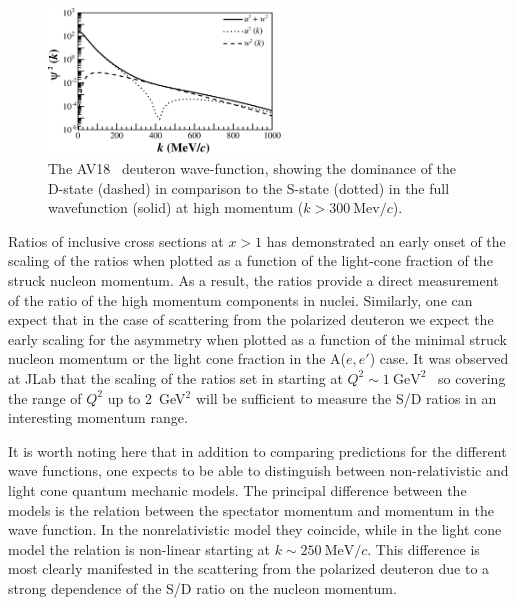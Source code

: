 \begin{figure}
\begin{center}
\includegraphics[width=0.55\textwidth]{figs/sd_wf_av18.eps}
\caption{\label{sd-wf} The AV18~\cite{PhysRevC.84.034003} deuteron wave-function, showing the dominance of the D-state (dashed) in comparison to the S-state (dotted) in the full wavefunction (solid) at high momentum ($k>300\mathrm{~Mev}/c$).}
\end{center}
\end{figure}

Ratios of inclusive cross sections at $x>1$ has demonstrated an early onset of the scaling of the ratios when plotted as a function of the light-cone fraction of the struck nucleon momentum.  As a result, the ratios provide a direct measurement of the ratio of the high momentum components in nuclei.  Similarly, one can expect that in the case of scattering from the polarized deuteron we expect the early scaling for the asymmetry when plotted as a function of the minimal struck nucleon momentum or the light cone fraction in the A($e,e'$) case.
It was observed at JLab that the scaling of the ratios set in starting at $Q^2 \sim 1 \mathrm{~GeV}^2$~\cite{Arrington:1998ps} so covering the range of $Q^2$ up to 2~GeV$^2$ will be sufficient to  measure the S/D ratios in an interesting momentum range. 







It is worth noting here that in addition to comparing predictions for the different wave functions, one expects to be able to distinguish between non-relativistic and light cone quantum mechanic models.  The principal difference between the models is the relation between the spectator momentum and momentum in the wave function. In the nonrelativistic model they coincide, while in the light cone model the relation is non-linear starting at $k \sim 250 \mathrm{~MeV}/c$. This difference is most clearly manifested in the scattering from the polarized deuteron due to a strong dependence of the S/D ratio on the nucleon momentum.

